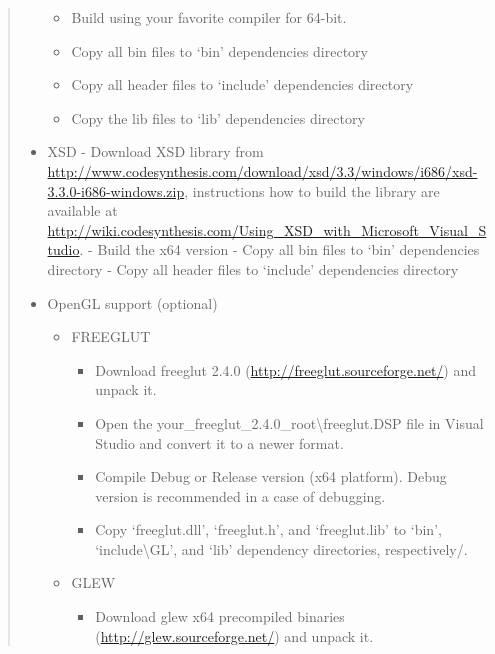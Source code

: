 \documentclass[a4paper,0pt,english]{sphinxmanual}
\begin{document}
\begin{quote}
\begin{itemize}
\begin{itemize}
\item {} 
Build using your favorite compiler for 64-bit.

\item {} 
Copy all bin files to `bin' dependencies directory

\item {} 
Copy all header files to `include' dependencies directory

\item {} 
Copy the lib files to `lib' dependencies directory

\end{itemize}

\item {} 
XSD
- Download XSD library from \href{http://www.codesynthesis.com/download/xsd/3.3/windows/i686/xsd-3.3.0-i686-windows.zip}{http://www.codesynthesis.com/download/xsd/3.3/windows/i686/xsd-3.3.0-i686-windows.zip}, instructions how to build the library are available at \href{http://wiki.codesynthesis.com/Using\_XSD\_with\_Microsoft\_Visual\_Studio}{http://wiki.codesynthesis.com/Using\_XSD\_with\_Microsoft\_Visual\_Studio}.
- Build the x64 version
- Copy all bin files to `bin' dependencies directory
- Copy all header files to `include' dependencies directory

\item {} 
OpenGL support (optional)
\begin{itemize}
\item {} 
FREEGLUT
\begin{itemize}
\item {} 
Download freeglut 2.4.0 (\href{http://freeglut.sourceforge.net/}{http://freeglut.sourceforge.net/}) and unpack it.

\item {} 
Open the your\_freeglut\_2.4.0\_root\textbackslash{}freeglut.DSP file in Visual Studio and convert it to a newer format.

\item {} 
Compile Debug or Release version (x64 platform). Debug version is recommended in a case of debugging.

\item {} 
Copy `freeglut.dll', `freeglut.h', and `freeglut.lib' to `bin', `include\textbackslash{}GL', and `lib' dependency directories, respectively/.

\end{itemize}

\item {} 
GLEW
\begin{itemize}
\item {} 
Download glew x64 precompiled binaries (\href{http://glew.sourceforge.net/}{http://glew.sourceforge.net/}) and unpack it.


\end{itemize}
\end{itemize}
\end{itemize}
\end{quote}
\end{document}
